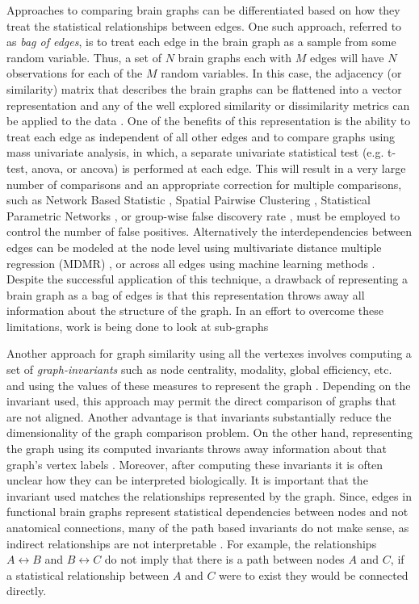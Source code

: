 Approaches to comparing brain graphs can be differentiated based on how they
treat the statistical relationships between edges. One such approach, referred
to as \emph{bag of edges}, is to treat each edge in the brain graph as a sample
from some random variable. Thus, a set of $N$ brain graphs each with $M$ edges
will have $N$ observations for each of the $M$ random variables. In this case,
the adjacency (or similarity) matrix that describes the brain graphs can be
flattened into a vector representation and any of the well explored similarity
or dissimilarity metrics can be applied to the data \cite{Ravindran}. One of
the benefits of this representation is the ability to treat each edge as
independent of all other edges and to compare graphs using mass univariate
analysis, in which, a separate univariate statistical test (e.g. t-test, anova,
or ancova) is performed at each edge. This will result in a very large number
of comparisons and an appropriate correction for multiple comparisons, such as
Network Based Statistic \cite{Zalesky2011}, Spatial Pairwise Clustering
\cite{Zalesky2012}, Statistical Parametric Networks \cite{Ginestet2013}, or
group-wise false discovery rate \cite{}, must be employed to control the number
of false positives. Alternatively the interdependencies between edges can be
modeled at the node level using multivariate distance multiple regression
(MDMR) \cite{Shehzad2014}, or across all edges using machine learning methods
\cite{Craddock2009, Dosenbach2010, Richiardi2011}. Despite the successful
application of this technique, a drawback of representing a brain graph as a
bag of edges is that this representation throws away all information about the
structure of the graph.  In an effort to overcome these limitations, work is
being done to look at sub-graphs \cite{} 

Another approach for graph similarity using all the vertexes involves computing
a set of \emph{graph-invariants} such as node centrality, modality, global
efficiency, etc. and using the values of these measures to represent the graph
\cite{rubinov}\cite{bullmoreReview}. Depending on the invariant used, this
approach may permit the direct comparison of graphs that are not aligned.
Another advantage is that invariants substantially reduce the dimensionality of
the graph comparison problem. On the other hand, representing the graph using
its computed invariants throws away information about that graph's vertex
labels \cite{Vogelstein2012}. Moreover, after computing these invariants it is
often unclear how they can be interpreted biologically. It is important that
the invariant used matches the relationships represented by the graph. Since,
edges in functional brain graphs represent statistical dependencies between
nodes and not anatomical connections, many of the path based invariants do not
make sense, as indirect relationships are not interpretable \cite{}. For
example, the relationships $A \leftrightarrow B$ and $B \leftrightarrow C$ do
not imply that there is a path between nodes $A$ and $C$, if a statistical
relationship between $A$ and $C$ were to exist they would be connected
directly.   

